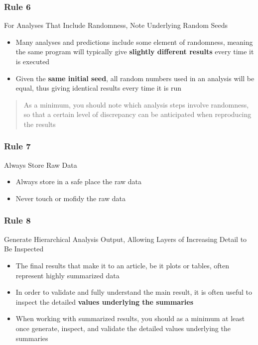 \documentclass{beamer}
\begin{document}
\begin{frame}
\frametitle{Rule 6}
{\sc For Analyses That Include Randomness, Note Underlying Random Seeds}
\pause
\begin{itemize}
	\item Many analyses and predictions include some element of randomness, meaning the same program will typically give \textbf{slightly different results} every time it is executed
	\item Given the \textbf{same initial seed}, all random numbers used in an analysis will be equal, thus giving identical results every time it is run
\end{itemize}
\begin{quote}
    As a minimum, you should note which analysis steps involve randomness, so that a certain level of discrepancy can be anticipated when reproducing the results
\end{quote}
\end{frame}
\begin{frame}
\frametitle{Rule 7}
{\sc Always Store Raw Data}\
\pause
\begin{itemize}
	\item {\sc Always} store in a safe place the raw data
	\item {\sc Never} touch or mofidy the raw data
\end{itemize}
\end{frame}
\begin{frame}
\frametitle{Rule 8}
{\sc Generate Hierarchical Analysis Output, Allowing Layers of Increasing Detail to Be Inspected}
\pause
\begin{itemize}
    \item The final results that make it to an article, be it plots or tables, often represent highly summarized data
    \item In order to validate and fully understand the main result, it is often useful to inspect the detailed \textbf{values underlying the summaries}
    \item When working with summarized results, you should as a minimum at least once generate, inspect, and validate the detailed values underlying the summaries
\end{itemize}

\end{frame}
\end{document}
